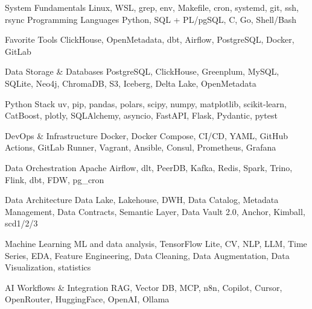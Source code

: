 

\begin{cvskills}

  \cvskill
    {System Fundamentals} %
    {Linux, WSL, grep, env, Makefile, cron, systemd, git, ssh, rsync} %
  \cvskill
    {Programming Languages} %
    {Python, SQL + PL/pgSQL, C, Go, Shell/Bash} %

  \cvskill
    {Favorite Tools} %
    {ClickHouse, OpenMetadata, dbt, Airflow, PostgreSQL, Docker, GitLab} %

  \cvskill
    {Data Storage \& Databases} %
    {PostgreSQL, ClickHouse, Greenplum, MySQL, SQLite, Neo4j, ChromaDB, S3, Iceberg, Delta Lake, OpenMetadata} %

  \cvskill
    {Python Stack} %
    {uv, pip, pandas, polars, scipy, numpy, matplotlib, scikit-learn, CatBoost, plotly, SQLAlchemy, asyncio, FastAPI, Flask, Pydantic, pytest} %

  \cvskill
    {DevOps \& Infrastructure} %
    {Docker, Docker Compose, CI/CD, YAML, GitHub Actions, GitLab Runner, Vagrant, Ansible, Consul, Prometheus, Grafana} %

  \cvskill
    {Data Orchestration} %
    {Apache Airflow, dlt, PeerDB, Kafka, Redis, Spark, Trino, Flink, dbt, FDW, pg\_cron} %

  \cvskill
    {Data Architecture} %
    {Data Lake, Lakehouse, DWH, Data Catalog, Metadata Management, Data Contracts, Semantic Layer, Data Vault 2.0, Anchor, Kimball, scd1/2/3} %

  \cvskill
    {Machine Learning} %
    {ML and data analysis, TensorFlow Lite, CV, NLP, LLM, Time Series, EDA, Feature Engineering, Data Cleaning, Data Augmentation, Data Visualization, statistics} %

  \cvskill
    {AI Workflows \& Integration} %
    {RAG, Vector DB, MCP, n8n, Copilot, Cursor, OpenRouter, HuggingFace, OpenAI, Ollama} %

\end{cvskills}


